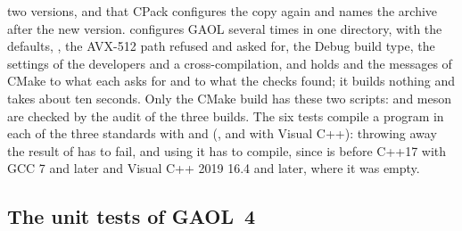 \documentclass[12pt,a4paper,twoside,openright]{book}
\begin{document}
two versions, and that CPack configures the copy again and names the archive
after the new version.  configures GAOL
several times in one directory, with the defaults, ,
the AVX-512 path refused and asked for, the Debug build type, the settings
of the developers and a cross-compilation, and holds
 and the messages of CMake to what each asks for
and to what the checks found; it builds nothing and takes about ten seconds.
Only the CMake build has these two scripts:  and meson are
checked by the audit of the three builds. The six tests 
compile a program in each of the three standards with
 and 
(,  and  with Visual C++):
throwing away the result of  has to fail, and using it has to
compile, since  is \code{[[nodiscard]]} before C++17
with GCC 7 and later and Visual C++ 2019 16.4 and later, where it was
empty.\newinvfive

\subsection{The unit tests of GAOL~4}
\end{document}
